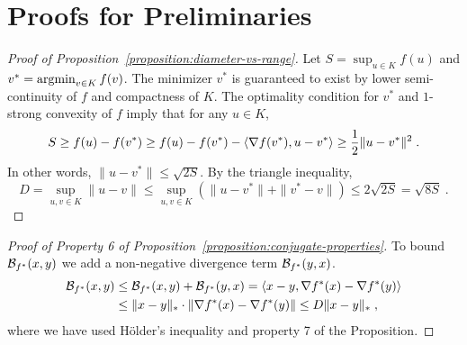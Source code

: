 \section{Proofs for Preliminaries}
\label{section:definitions-proofs}

\begin{proof}[Proof of Proposition~\ref{proposition:diameter-vs-range}]
Let $S = \sup_{u \in K} f(u)$ and $v^* = \operatorname*{argmin}_{v \in K} f(v)$. The minimizer
$v^*$ is guaranteed to exist by lower semi-continuity of $f$ and compactness of
$K$.  The optimality condition for $v^*$ and $1$-strong convexity of $f$ imply that
for any $u \in K$,
$$
S
\ge f(u) - f(v^*)
\ge f(u) - f(v^*) - \langle \nabla f(v^*), u - v^* \rangle
\ge \frac{1}{2}\|u - v^*\|^2 \; .
$$
In other words, $\|u - v^*\| \le \sqrt{2S}$. By the triangle inequality,
$$
D = \sup_{u,v \in K} \|u - v\| \le \sup_{u,v \in K} \left( \|u - v^*\| + \|v^ * - v\| \right) \le 2\sqrt{2S} = \sqrt{8S} \; .
$$
\end{proof}

\begin{proof}[Proof of Property 6 of Proposition~\ref{proposition:conjugate-properties}]
To bound $\mathcal{B}_{f^*}(x,y)$ we add a non-negative divergence term
$\mathcal{B}_{f^*}(y,x)$.
\begin{align*}
\mathcal{B}_{f^*}(x, y)
& \le \mathcal{B}_{f^*}(x,y) + \mathcal{B}_{f^*}(y,x)
= \langle x - y, \nabla f^*(x) - \nabla f^*(y) \rangle \\
& \le \|x - y\|_* \cdot \| \nabla f^*(x) - \nabla f^*(y) \|
\le D \|x - y\|_* \; ,
\end{align*}
where we have used H\"older's inequality and property 7 of the Proposition.
\end{proof}

